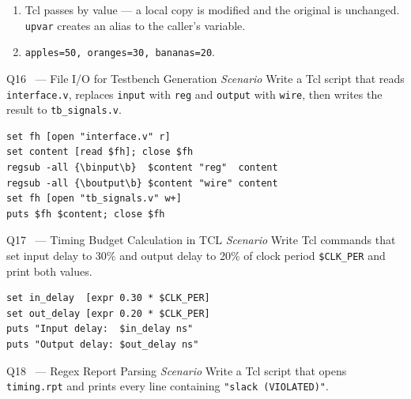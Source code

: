 \documentclass[12pt,a4paper]{article}
\newcommand{\advanced}{%
  \fbox{\textcolor{advred}{\bfseries\sffamily\small ADVANCED}}}
\newcommand{\moderate}{%
  \fbox{\textcolor{modoran}{\bfseries\sffamily\small MODERATE}}}
\begin{document}
\begin{answerbox}
\begin{enumerate}[label=\textbf{\alph*)}]
  \item Tcl passes by value --- a local copy is modified and the original is unchanged. \texttt{upvar} creates an alias to the caller's variable.
  \item \texttt{apples=50, oranges=30, bananas=20}.
\end{enumerate}
\end{answerbox}

\begin{questionbox}{Q16 \moderate\ --- File I/O for Testbench Generation \hfill\textit{Scenario}}
Write a Tcl script that reads \texttt{interface.v}, replaces \texttt{input} with \texttt{reg} and \texttt{output} with \texttt{wire}, then writes the result to \texttt{tb\_signals.v}.
\end{questionbox}

\begin{answerbox}
\begin{lstlisting}[style=tclstyle]
set fh [open "interface.v" r]
set content [read $fh]; close $fh
regsub -all {\binput\b}  $content "reg"  content
regsub -all {\boutput\b} $content "wire" content
set fh [open "tb_signals.v" w+]
puts $fh $content; close $fh
\end{lstlisting}
\end{answerbox}

\begin{questionbox}{Q17 \advanced\ --- Timing Budget Calculation in TCL \hfill\textit{Scenario}}
Write Tcl commands that set input delay to 30\% and output delay to 20\% of clock period \texttt{\$CLK\_PER} and print both values.
\end{questionbox}

\begin{answerbox}
\begin{lstlisting}[style=tclstyle]
set in_delay  [expr 0.30 * $CLK_PER]
set out_delay [expr 0.20 * $CLK_PER]
puts "Input delay:  $in_delay ns"
puts "Output delay: $out_delay ns"
\end{lstlisting}
\end{answerbox}

\begin{questionbox}{Q18 \advanced\ --- Regex Report Parsing \hfill\textit{Scenario}}
Write a Tcl script that opens \texttt{timing.rpt} and prints every line containing \texttt{"slack (VIOLATED)"}.
\end{questionbox}
\end{document}
